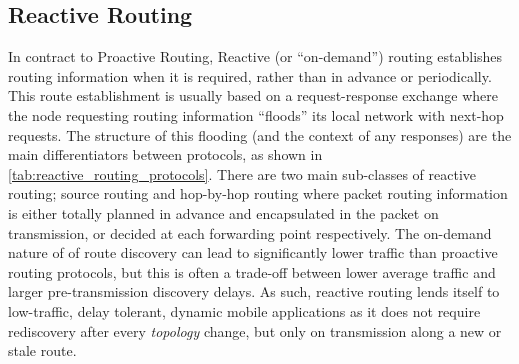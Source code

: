 \subsection{Reactive Routing}

In contract to Proactive Routing, Reactive (or ``on-demand'') routing establishes routing information when it is required, rather than in advance or periodically.
This route establishment is usually based on a request-response exchange where the node requesting routing information ``floods'' its local network with next-hop requests.
The structure of this flooding (and the context of any responses) are the main differentiators between protocols, as shown in \autoref{tab:reactive_routing_protocols}.
There are two main sub-classes of reactive routing; source routing and hop-by-hop routing where packet routing information is either totally planned in advance and encapsulated in the packet on transmission, or decided at each forwarding point respectively.
The on-demand nature of of route discovery can lead to significantly lower traffic than proactive routing protocols, but this is often a trade-off between lower average traffic and larger pre-transmission discovery delays. 
As such, reactive routing lends itself to low-traffic, delay tolerant, dynamic mobile applications as it does not require rediscovery after every \emph{topology} change, but only on transmission along a new or stale route.

